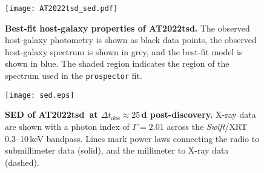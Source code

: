 \documentclass{nature_plusfigure}
\newcommand{\at}{AT2022tsd}
\begin{document}
\begin{supplement}
\begin{figure}[!ht]
 \centering
\texttt{[image: AT2022tsd\_sed.pdf]}
  \caption{\textbf{Best-fit host-galaxy properties of \at.} The observed host-galaxy photometry is shown as black data points, the observed host-galaxy spectrum is shown in grey, and the best-fit model is shown in blue. The shaded region indicates the region of the spectrum used in the \texttt{prospector} fit.
}
 \label{fig:host-fit}
\end{figure}

\begin{figure}[!ht]
 \centering
\texttt{[image: sed.eps]}
  \caption{\textbf{SED of \at\ at $\Delta t_\mathrm{obs}\approx25\,$d post-discovery.} X-ray data are shown with a photon index of $\Gamma=2.01$ across the {\it Swift}/XRT 0.3--10\,keV bandpass. Lines mark power laws connecting the radio to submillimeter data (solid), and the millimeter to X-ray data (dashed).}
 \label{fig:full-sed}
\end{figure}


\end{supplement}
\end{document}
